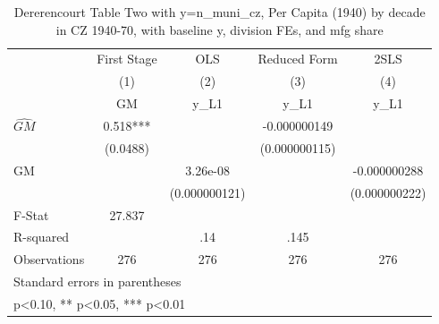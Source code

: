 \begin{table}[htbp]\centering
\def\sym#1{\ifmmode^{#1}\else\(^{#1}\)\fi}
\caption{Dererencourt Table Two with y=n\_muni\_cz, Per Capita (1940) by decade in CZ 1940-70, with baseline y, division FEs, and mfg share}
\begin{tabular}{l*{4}{c}}
\toprule
                    & First Stage   &         OLS   &Reduced Form   &        2SLS   \\
                    &\multicolumn{1}{c}{(1)}&\multicolumn{1}{c}{(2)}&\multicolumn{1}{c}{(3)}&\multicolumn{1}{c}{(4)}\\
                    &\multicolumn{1}{c}{GM}&\multicolumn{1}{c}{y\_L1}&\multicolumn{1}{c}{y\_L1}&\multicolumn{1}{c}{y\_L1}\\
\midrule
$\hat{GM}$          &       0.518***&               &-0.000000149   &               \\
                    &    (0.0488)   &               &(0.000000115)   &               \\
\addlinespace
GM                  &               &    3.26e-08   &               &-0.000000288   \\
                    &               &(0.000000121)   &               &(0.000000222)   \\
\midrule
F-Stat              &      27.837   &               &               &               \\
R-squared           &               &         .14   &        .145   &               \\
Observations        &         276   &         276   &         276   &         276   \\
\bottomrule
\multicolumn{5}{l}{\footnotesize Standard errors in parentheses}\\
\multicolumn{5}{l}{\footnotesize * p<0.10, ** p<0.05, *** p<0.01}\\
\end{tabular}
\end{table}
